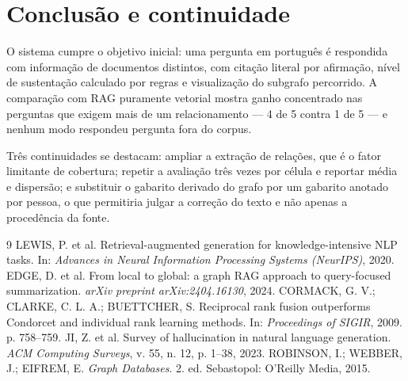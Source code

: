 \documentclass[12pt]{article}
\begin{document}
\section{Conclusão e continuidade}

O sistema cumpre o objetivo inicial: uma pergunta em português é respondida com informação de
documentos distintos, com citação literal por afirmação, nível de sustentação calculado por regras
e visualização do subgrafo percorrido. A comparação com RAG puramente vetorial mostra ganho
concentrado nas perguntas que exigem mais de um relacionamento --- 4 de 5 contra 1 de 5 --- e
nenhum modo respondeu pergunta fora do corpus.

Três continuidades se destacam: ampliar a extração de relações, que é o fator limitante de
cobertura; repetir a avaliação três vezes por célula e reportar média e dispersão; e substituir o
gabarito derivado do grafo por um gabarito anotado por pessoa, o que permitiria julgar a correção
do texto e não apenas a procedência da fonte.

\begin{thebibliography}{9}
 LEWIS, P. et al. Retrieval-augmented generation for knowledge-intensive NLP
tasks. In: \emph{Advances in Neural Information Processing Systems (NeurIPS)}, 2020.
 EDGE, D. et al. From local to global: a graph RAG approach to query-focused
summarization. \emph{arXiv preprint arXiv:2404.16130}, 2024.
 CORMACK, G. V.; CLARKE, C. L. A.; BUETTCHER, S. Reciprocal rank fusion
outperforms Condorcet and individual rank learning methods. In: \emph{Proceedings of SIGIR}, 2009.
p. 758--759.
 JI, Z. et al. Survey of hallucination in natural language generation.
\emph{ACM Computing Surveys}, v. 55, n. 12, p. 1--38, 2023.
 ROBINSON, I.; WEBBER, J.; EIFREM, E. \emph{Graph Databases}. 2. ed.
Sebastopol: O'Reilly Media, 2015.
\end{thebibliography}
\end{document}
